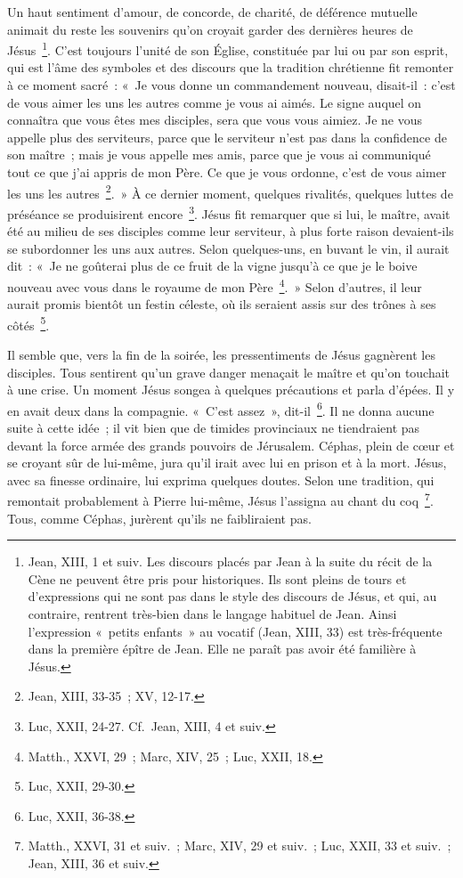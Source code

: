 \documentclass[french,twoside]{book} %
\newcommand\chapterclose{} %
\begin{document}
Un haut sentiment d’amour, de concorde, de charité, de déférence mutuelle animait du reste les souvenirs qu’on croyait garder des dernières heures de Jésus \footnote{Jean, XIII, 1 et suiv. Les discours placés par Jean à la suite du récit de la Cène ne peuvent être pris pour historiques. Ils sont pleins de tours et d’expressions qui ne sont pas dans le style des discours de Jésus, et qui, au contraire, rentrent très-bien dans le langage habituel de Jean. Ainsi l’expression « petits enfants » au vocatif (Jean, XIII, 33) est très-fréquente dans la première épître de Jean. Elle ne paraît pas avoir été familière à Jésus.}. C’est toujours l’unité de son Église, constituée par lui ou par son esprit, qui est l’âme des symboles et des discours que la tradition chrétienne fit remonter à ce moment sacré : « Je vous donne un commandement nouveau, disait-il : c’est de vous aimer les uns les autres comme je vous ai aimés. Le signe auquel on connaîtra que vous êtes mes disciples, sera que vous vous aimiez. Je ne vous appelle plus des serviteurs, parce que le serviteur n’est pas dans la confidence de son maître ; mais je vous appelle mes amis, parce que je vous ai communiqué tout ce que j’ai appris de mon Père. Ce que je vous ordonne, c’est de vous aimer les uns les autres \footnote{Jean, XIII, 33-35 ; XV, 12-17.}. » À ce dernier moment, quelques rivalités, quelques luttes de préséance se produisirent encore \footnote{Luc, XXII, 24-27. Cf. Jean, XIII, 4 et suiv.}. Jésus fit remarquer que si lui, le maître, avait été au milieu de ses disciples comme leur serviteur, à plus forte raison devaient-ils se subordonner les uns aux autres. Selon quelques-uns, en buvant le vin, il aurait dit : « Je ne goûterai plus de ce fruit de la vigne jusqu’à ce que je le boive nouveau avec vous dans le royaume de mon Père \footnote{Matth., XXVI, 29 ; Marc, XIV, 25 ; Luc, XXII, 18.}. » Selon d’autres, il leur aurait promis bientôt un festin céleste, où ils seraient assis sur des trônes à ses côtés \footnote{Luc, XXII, 29-30.}.\par
Il semble que, vers la fin de la soirée, les pressentiments de Jésus gagnèrent les disciples. Tous sentirent qu’un grave danger menaçait le maître et qu’on touchait à une crise. Un moment Jésus songea à quelques précautions et parla d’épées. Il y en avait deux dans la compagnie. « C’est assez », dit-il \footnote{Luc, XXII, 36-38.}. Il ne donna aucune suite à cette idée ; il vit bien que de timides provinciaux ne tiendraient pas devant la force armée des grands pouvoirs de Jérusalem. Céphas, plein de cœur et se croyant sûr de lui-même, jura qu’il irait avec lui en prison et à la mort. Jésus, avec sa finesse ordinaire, lui exprima quelques doutes. Selon une tradition, qui remontait probablement à Pierre lui-même, Jésus l’assigna au chant du coq \footnote{Matth., XXVI, 31 et suiv. ; Marc, XIV, 29 et suiv. ; Luc, XXII, 33 et suiv. ; Jean, XIII, 36 et suiv.}. Tous, comme Céphas, jurèrent qu’ils ne faibliraient pas.
\chapterclose
\end{document}
